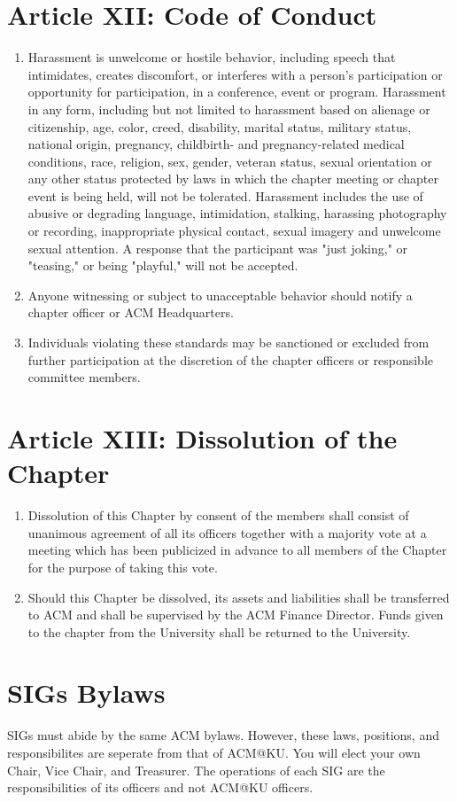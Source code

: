 \section*{Article XII: Code of Conduct}

\begin{enumerate}
	\item Harassment is unwelcome or hostile behavior, including speech that intimidates, creates discomfort, or interferes with a person's participation or opportunity for participation, in a conference, event or program. Harassment in any form, including but not limited to harassment based on alienage or citizenship, age, color, creed, disability, marital status, military status, national origin, pregnancy, childbirth- and pregnancy-related medical conditions, race, religion, sex, gender, veteran status, sexual orientation or any other status protected by laws in which the chapter meeting or chapter event is being held, will not be tolerated. Harassment includes the use of abusive or degrading language, intimidation, stalking, harassing photography or recording, inappropriate physical contact, sexual imagery and unwelcome sexual attention. A response that the participant was "just joking," or "teasing," or being "playful," will not be accepted.
	\item Anyone witnessing or subject to unacceptable behavior should notify a chapter officer or ACM Headquarters.
	\item Individuals violating these standards may be sanctioned or excluded from further participation at the discretion of the chapter officers or responsible committee members.
\end{enumerate}

\section*{Article XIII: Dissolution of the Chapter}

\begin{enumerate}
	\item Dissolution of this Chapter by consent of the members shall consist of unanimous agreement of all its officers together with a majority vote at a meeting which has been publicized in advance to all members of the Chapter for the purpose of taking this vote.
	\item Should this Chapter be dissolved, its assets and liabilities shall be transferred to ACM and shall be supervised by the ACM Finance Director. Funds given to the chapter from the University shall be returned to the University.
\end{enumerate}



\section{SIGs Bylaws}
SIGs must abide by the same ACM bylaws. However, these laws, positions, and responsibilites are seperate from that of ACM@KU. You will elect your own Chair, Vice Chair, and Treasurer. The operations of each SIG are the responsibilities of its officers and not ACM@KU officers.

